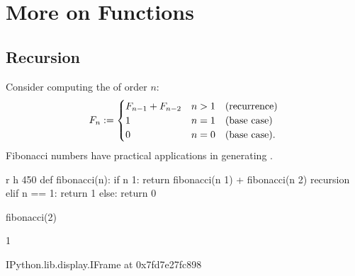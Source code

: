 \documentclass[letterpaper,10pt,english]{sphinxmanual}
\begin{document}
\chapter{More on Functions}
\label{\detokenize{Lecture6/More on Functions:more-on-functions}}\label{\detokenize{Lecture6/More on Functions::doc}}

\section{Recursion}
\label{\detokenize{Lecture6/More on Functions:recursion}}
Consider computing the  of order \(n\):
\begin{equation*}
\begin{split}
F_n := 
\begin{cases}
F_{n-1}+F_{n-2} & n>1 \kern1em \text{(recurrence)}\\
1 & n=1 \kern1em \text{(base case)}\\
0 & n=0 \kern1em \text{(base case)}.
\end{cases}\end{split}
\end{equation*}
Fibonacci numbers have practical applications in generating .


\begin{sphinxVerbatim}[commandchars=\\\{\}]
 \PYGZhy{}r \PYGZhy{}h 450
def fibonacci(n):
    if n \PYGZgt{} 1:
        return fibonacci(n \PYGZhy{} 1) + fibonacci(n \PYGZhy{} 2)  \PYGZsh{} recursion
    elif n == 1:
        return 1
    else:
        return 0

fibonacci(2)
\end{sphinxVerbatim}

\begin{sphinxVerbatim}[commandchars=\\\{\}]
1
\end{sphinxVerbatim}

\begin{sphinxVerbatim}[commandchars=\\\{\}]
\PYGZlt{}IPython.lib.display.IFrame at 0x7fd7e27fc898\PYGZgt{}
\end{sphinxVerbatim}
\end{document}
